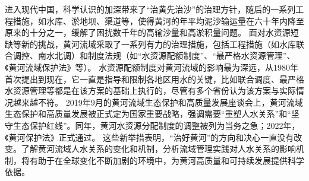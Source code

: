 进入现代中国，科学认识的加深带来了“治黄先治沙”的治理方针，随后的一系列工程措施，如水库、淤地坝、渠道等，使得黄河的年平均泥沙输运量在六十年内降至原来的十分之一，缓解了困扰数千年的高输沙量和高淤积量问题\cite{wang2016a}。
面对水资源短缺等新的挑战，黄河流域采取了一系列有力的治理措施，包括工程措施（如水库联合调控、南水北调）和制度法规（如“水资源配额制度”、“最严格水资源管理”、《黄河流域保护法》等）\cite{shuilibuhuangheshuiliweiyuanhui2010}。
水资源配额制度对黄河流域的影响最为深远，从1980年首次提出到现在，它一直是指导和限制各地区用水的关键，比如联合调度、最严格水资源管理等都是在该方案的基础上执行的，尽管有多个省份认为该方案与实际情况越来越不符\cite{wang2019b,wang2019e}。
2019年9月的黄河流域生态保护和高质量发展座谈会上，黄河流域生态保护和高质量发展被正式定为国家重要战略，强调需要“重塑人水关系”和“坚守生态保护红线”。同年，黄河水资源分配制度的调整被列为当务之急；2022年，《黄河保护法》正式通过\cite{lu2019,dongzhanfeng2020}。
这些新举措表明，“治好黄河”的方向和决心一直没有改变。了解黄河流域人水关系的变化和机制，分析流域管理实践对人水关系的影响机制，将有助于在全球变化不断加剧的环境中，为黄河高质量和可持续发展提供科学依据。
